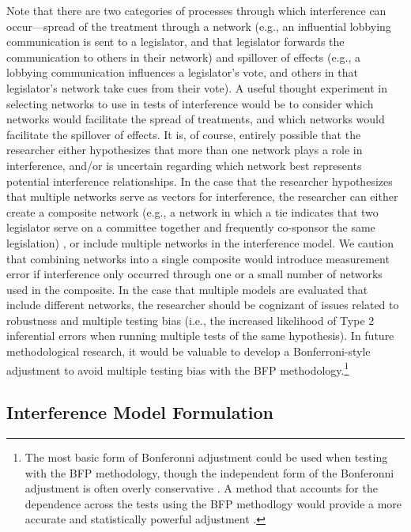 \documentclass[12pt]{article}
\begin{document}
Note that there are two categories of processes through which interference can occur---spread of the treatment through a network (e.g., an influential lobbying communication is sent to a legislator, and that legislator forwards the communication to others in their network) and spillover of effects (e.g., a lobbying communication influences a legislator's vote, and others in that legislator's network take cues from their vote). A useful thought experiment in selecting networks to use in tests of interference would be to consider which networks would facilitate the spread of treatments, and which networks would facilitate the spillover of effects. It is, of course, entirely possible that the researcher either hypothesizes that more than one network plays a role in interference, and/or is uncertain regarding which network best represents potential interference relationships. In the case that the researcher hypothesizes that multiple networks serve as vectors for interference,  the researcher can either create a composite network (e.g., a network in which a tie indicates that two legislator serve on a committee together and frequently co-sponsor the same legislation) \citep[e.g.,][]{ansari2011modeling}, or include multiple networks in the interference model. We caution that combining networks into a single composite would introduce measurement error if interference only occurred through one or a small number of networks used in the composite.  In the case that multiple models are evaluated that include different networks, the researcher should be cognizant of issues related to robustness and multiple testing bias (i.e., the increased likelihood of Type 2 inferential errors when running multiple tests of the same hypothesis). In future methodological research, it would be valuable to develop a Bonferroni-style adjustment \citep{cabin2000bonferroni} to avoid multiple testing bias with the BFP methodology.\footnote{The most basic form of Bonferonni adjustment could be used when testing with the BFP methodology, though the independent form of the Bonferonni adjustment is often overly conservative \citep{simes1986improved}. A method that accounts for the dependence across the tests using the BFP methodlogy would provide a more accurate and statistically powerful adjustment \citep{stevens2017comparison}.} 

\subsection{Interference Model Formulation}
\end{document}
